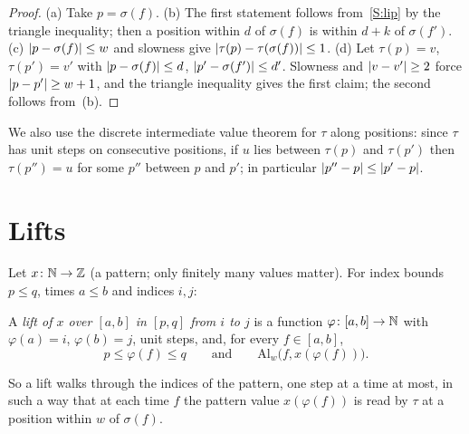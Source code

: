 \begin{proof}
(a) Take $p=\sigma(f)$. (b) The first statement follows from~\ref{S:lip} by the triangle inequality; then a
position within $d$ of $\sigma(f)$ is within $d+k$ of $\sigma(f')$. (c) $\left\lvert p-\sigma(f)\right\rvert\le w$ and
slowness give $\left\lvert \tau(p)-\tau(\sigma(f))\right\rvert\le1$. (d) Let $\tau(p)=v$, $\tau(p')=v'$ with
$\left\lvert p-\sigma(f)\right\rvert\le d$, $\left\lvert p'-\sigma(f')\right\rvert\le d'$. Slowness and $\left\lvert v-v'\right\rvert\ge2$ force $\left\lvert p-p'\right\rvert\ge w+1$,
and the triangle inequality gives the first claim; the second follows from~(b).
\end{proof}


We also use the discrete intermediate value theorem  for $\tau$ along positions: since $\tau$ has
unit steps on consecutive positions, if $u$ lies between $\tau(p)$ and $\tau(p')$ then $\tau(p'')=u$ for some
$p''$ between $p$ and $p'$; in particular $\left\lvert p''-p\right\rvert\le\left\lvert p'-p\right\rvert$.


\section{Lifts}

Let $x\colon\mathbb{N}\to\mathbb{Z}$ (a pattern; only finitely many values matter). For index bounds $p\le q$, times
$a\le b$ and indices $i,j$:

\begin{definition}\label{def:lift}
A \emph{lift of $x$ over $[a,b]$ in $[p,q]$ from $i$ to $j$} is a function $\varphi\colon[a,b]\to\mathbb{N}$ with
$\varphi(a)=i$, $\varphi(b)=j$, unit steps, and, for every $f\in[a,b]$,
\[
p\le\varphi(f)\le q\qquad\text{and}\qquad \mathrm{Al}_w\bigl(f,x(\varphi(f))\bigr).
\]
\end{definition}

So a lift walks through the indices of the pattern, one step at a time at most, in such a way that at each
time $f$ the pattern value $x(\varphi(f))$ is read by $\tau$ at a position within $w$ of $\sigma(f)$.


